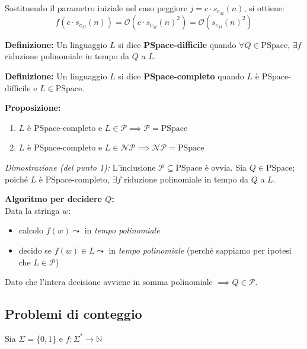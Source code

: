 Sostituendo il parametro iniziale nel caso peggiore $j = c \cdot s_{c_M}(n)$, si ottiene:
$$ f(c \cdot s_{c_M}(n)) = \mathcal{O}(c \cdot s_{c_M}(n)^2) = \mathcal{O}(s_{c_M}(n)^2) $$

\vspace{0.4cm}
\textbf{Definizione:} Un linguaggio $L$ si dice \textbf{PSpace-difficile} quando $\forall Q \in \text{PSpace}$, $\exists f$ riduzione polinomiale in tempo da $Q$ a $L$.

\textbf{Definizione:} Un linguaggio $L$ si dice \textbf{PSpace-completo} quando $L$ è PSpace-difficile e $L \in \text{PSpace}$.

\vspace{0.4cm}
\textbf{Proposizione:} 
\begin{enumerate}
    \item $L$ è PSpace-completo e $L \in \mathcal{P} \implies \mathcal{P} = \text{PSpace}$
    \item $L$ è PSpace-completo e $L \in \mathcal{NP} \implies \mathcal{NP} = \text{PSpace}$
\end{enumerate}

\textit{Dimostrazione (del punto 1):}
L'inclusione $\mathcal{P} \subseteq \text{PSpace}$ è ovvia. 
Sia $Q \in \text{PSpace}$; poiché $L$ è PSpace-completo, $\exists f$ riduzione polinomiale in tempo da $Q$ a $L$.

\textbf{Algoritmo per decidere $Q$:} \\
Data la stringa $w$:
\begin{itemize}
    \item calcolo $f(w) \leadsto$ in \textit{tempo polinomiale}
    \item decido se $f(w) \in L \leadsto$ in \textit{tempo polinomiale} (perché sappiamo per ipotesi che $L \in \mathcal{P}$)
\end{itemize}
Dato che l'intera decisione avviene in somma polinomiale $\implies Q \in \mathcal{P}$.
















\newpage{}
\subsection{Problemi di conteggio}

Sia $\Sigma = \{0, 1\}$ e $f: \Sigma^* \to \mathbb{N}$


